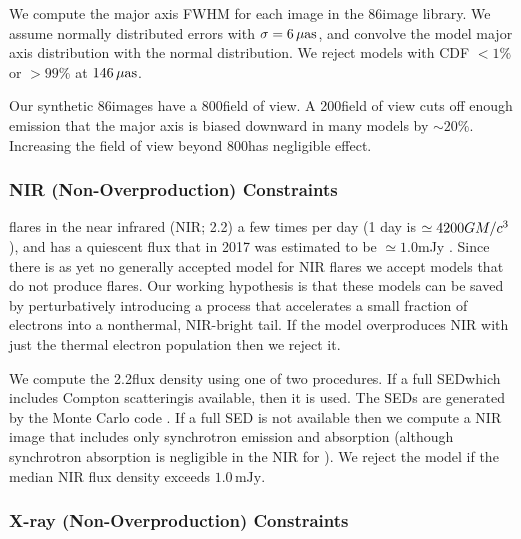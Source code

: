 We compute the major axis FWHM for each image in the 86\GHz image library.  We assume normally distributed errors with $\sigma = 6\,\mathrm{\mu as}$, and convolve the model major axis distribution with the normal distribution.  We reject models with CDF $< 1\%$ or $> 99\%$ at $146\,\mathrm{\mu as}$.

Our synthetic 86\GHz images have a 800\uas field of view.  A 200\uas field of view cuts off enough emission that the major axis is biased downward in many models by $\sim 20\%$.  Increasing the field of view beyond 800\uas has negligible effect.

\subsubsection{NIR (Non-Overproduction) Constraints}\label{subsec:nir}


\sgra flares in the near infrared (NIR; 2.2\um) a few times per day (1 day is $\simeq 4200 GM/c^3$), and has a quiescent flux that in 2017 was estimated to be $\simeq 1.0$mJy \citep{2020A&A...638A...2G}.  Since there is as yet no generally accepted model for NIR flares we accept models that do not produce flares.  Our working hypothesis is that these models can be saved by perturbatively introducing a process that accelerates a small fraction of electrons into a nonthermal, NIR-bright tail.  If the model overproduces NIR with just the thermal electron population then we reject it.

We compute the 2.2\um flux density using one of two procedures.  If a full SED\textemdash which includes Compton scattering\textemdash is available, then it is used. The SEDs are generated by the \grmonty Monte Carlo code \citep[][also Wong et al. 2022, Davelaar et al. 2022]{2009ApJS..184..387D}. If a full SED is not available then we compute a NIR image that includes only synchrotron emission and absorption (although synchrotron absorption is negligible in the NIR for \sgra).  We reject the model if the median NIR flux density exceeds $1.0\,\mathrm{mJy}$.

\subsubsection{X-ray (Non-Overproduction) Constraints}



